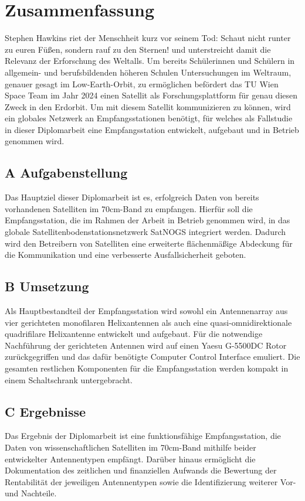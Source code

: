 \section*{Zusammenfassung}
Stephen Hawkins riet der Menschheit kurz vor seinem Tod: \glqq Schaut nicht runter zu euren Füßen, sondern rauf zu den Sternen!\grqq{} und unterstreicht damit die Relevanz der Erforschung des Weltalls. Um bereits Schülerinnen und Schülern in allgemein- und berufsbildenden höheren Schulen Untersuchungen im Weltraum, genauer gesagt im Low-Earth-Orbit, zu ermöglichen befördert das TU Wien Space Team im Jahr 2024 einen Satellit als Forschungsplattform für genau diesen Zweck in den Erdorbit. Um mit diesem Satellit kommunizieren zu können, wird ein globales Netzwerk an Empfangsstationen benötigt, für welches als Fallstudie in dieser Diplomarbeit eine Empfangsstation entwickelt, aufgebaut und in Betrieb genommen wird. 

\subsection*{A Aufgabenstellung}
Das Hauptziel dieser Diplomarbeit ist es, erfolgreich Daten von bereits vorhandenen Satelliten im 70cm-Band zu empfangen. Hierfür soll die Empfangsstation, die im Rahmen der Arbeit in Betrieb genommen wird, in das globale Satellitenbodenstationsnetzwerk SatNOGS integriert werden. Dadurch wird den Betreibern von Satelliten eine erweiterte flächenmäßige Abdeckung für die Kommunikation und eine verbesserte Ausfallsicherheit geboten.

\subsection*{B Umsetzung}
Als Hauptbestandteil der Empfangsstation wird sowohl ein Antennenarray aus vier gerichteten monofilaren Helixantennen als auch eine quasi-omnidirektionale quadrifilare Helixantenne entwickelt und aufgebaut. Für die notwendige Nachführung der gerichteten Antennen wird auf einen Yaesu G-5500DC Rotor zurückgegriffen und das dafür benötigte Computer Control Interface emuliert. Die gesamten restlichen Komponenten für die Empfangsstation werden kompakt in einem Schaltschrank untergebracht.  

\subsection*{C Ergebnisse}
Das Ergebnis der Diplomarbeit ist eine funktionsfähige Empfangsstation, die Daten von wissenschaftlichen Satelliten im 70cm-Band mithilfe beider entwickelter Antennentypen empfängt. Darüber hinaus ermöglicht die Dokumentation des zeitlichen und finanziellen Aufwands die Bewertung der Rentabilität der jeweiligen Antennentypen sowie die Identifizierung weiterer Vor- und Nachteile.
